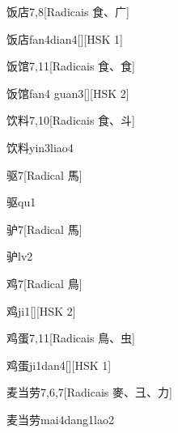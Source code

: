 \begin{entry}{饭店}{7,8}[Radicais ⾷、⼴]
  \begin{phonetics}{饭店}{fan4dian4}[][HSK 1]
  \end{phonetics}
\end{entry}

\begin{entry}{饭馆}{7,11}[Radicais ⾷、⾷]
  \begin{phonetics}{饭馆}{fan4 guan3}[][HSK 2]
  \end{phonetics}
\end{entry}

\begin{entry}{饮料}{7,10}[Radicais ⾷、⽃]
  \begin{phonetics}{饮料}{yin3liao4}
  \end{phonetics}
\end{entry}

\begin{entry}{驱}{7}[Radical ⾺]
  \begin{phonetics}{驱}{qu1}
  \end{phonetics}
\end{entry}

\begin{entry}{驴}{7}[Radical ⾺]
  \begin{phonetics}{驴}{lv2}
  \end{phonetics}
\end{entry}

\begin{entry}{鸡}{7}[Radical ⿃]
  \begin{phonetics}{鸡}{ji1}[][HSK 2]
  \end{phonetics}
\end{entry}

\begin{entry}{鸡蛋}{7,11}[Radicais ⿃、⾍]
  \begin{phonetics}{鸡蛋}{ji1dan4}[][HSK 1]
  \end{phonetics}
\end{entry}

\begin{entry}{麦当劳}{7,6,7}[Radicais ⿆、⼹、⼒]
  \begin{phonetics}{麦当劳}{mai4dang1lao2}
  \end{phonetics}
\end{entry}

